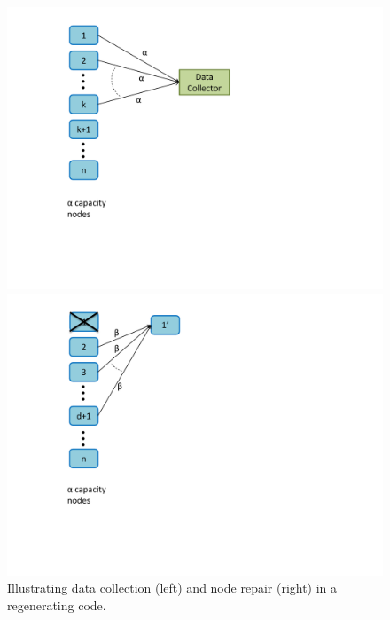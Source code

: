 	\begin{figure}[!h]
		\begin{center}
			\begin{minipage}[t]{0.35\textwidth}
				\includegraphics[scale=.5]{src/Figures/chap4/data_collection}
			\end{minipage}
			\hspace*{0.45in}
			\begin{minipage}[t]{0.25\textwidth}
				\includegraphics[scale=.5]{src/Figures/chap4/node_repair}
			\end{minipage}
		\end{center}
		\caption{Illustrating data collection (left) and node repair (right) in a regenerating code.} \label{fig:RGC} 
	\end{figure}

